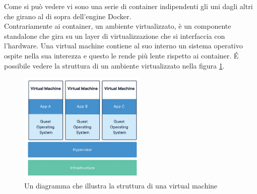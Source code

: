 Come si può vedere vi sono una serie di container indipendenti gli uni dagli altri che girano al di sopra dell'engine Docker.
\\
Contrariamente ai container, un ambiente virtualizzato, è un componente standalone che gira su un layer di virtualizzazione che si interfaccia con l'hardware. Una virtual machine contiene al suo interno un sistema operativo ospite nella sua interezza e questo le rende più lente rispetto ai container. \'E possibile vedere la struttura di un ambiente virtualizzato nella figura \ref{fig:virtualMachine}.

\begin{figure}[h]
    \centering
    \includegraphics[height=200px]{./images/virtualization.png}
    \caption{Un diagramma che illustra la struttura di una virtual machine}
    \label{fig:virtualMachine}
\end{figure}

